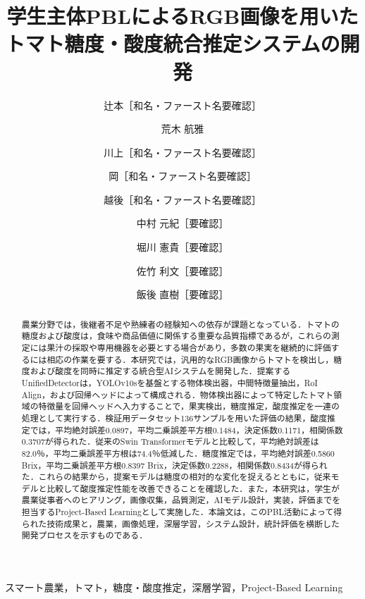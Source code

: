 \documentclass[authorproof,JRM,paper]{fujipressarticle}
\begin{document}
\pagestyle{fujipressstyle}

\title{学生主体PBLによるRGB画像を用いたトマト糖度・酸度統合推定システムの開発}
\author{辻本［和名・ファースト名要確認］ \and 荒木 航雅 \and 川上［和名・ファースト名要確認］ \and 岡［和名・ファースト名要確認］ \and 越後［和名・ファースト名要確認］ \and 中村 元紀［要確認］ \and 堀川 憲貴［要確認］ \and 佐竹 利文［要確認］ \and 飯後 直樹［要確認］}
\address{所属機関［要確認］\\
	住所［要確認］\\
	E-mail: メールアドレス［要確認］}
\maketitle

\begin{abstract}%
	\noindent 農業分野では，後継者不足や熟練者の経験知への依存が課題となっている．トマトの糖度および酸度は，食味や商品価値に関係する重要な品質指標であるが，これらの測定には果汁の採取や専用機器を必要とする場合があり，多数の果実を継続的に評価するには相応の作業を要する．本研究では，汎用的なRGB画像からトマトを検出し，糖度および酸度を同時に推定する統合型AIシステムを開発した．提案するUnifiedDetectorは，YOLOv10sを基盤とする物体検出器，中間特徴量抽出，RoI Align，および回帰ヘッドによって構成される．物体検出器によって特定したトマト領域の特徴量を回帰ヘッドへ入力することで，果実検出，糖度推定，酸度推定を一連の処理として実行する．検証用データセット136サンプルを用いた評価の結果，酸度推定では，平均絶対誤差0.0897，平均二乗誤差平方根0.1484，決定係数0.1171，相関係数0.3707が得られた．従来のSwin Transformerモデルと比較して，平均絶対誤差は82.0％，平均二乗誤差平方根は74.4％低減した．糖度推定では，平均絶対誤差0.5860 Brix，平均二乗誤差平方根0.8397 Brix，決定係数0.2288，相関係数0.8434が得られた．これらの結果から，提案モデルは糖度の相対的な変化を捉えるとともに，従来モデルと比較して酸度推定性能を改善できることを確認した．また，本研究は，学生が農業従事者へのヒアリング，画像収集，品質測定，AIモデル設計，実装，評価までを担当するProject-Based Learningとして実施した．本論文は，このPBL活動によって得られた技術成果と，農業，画像処理，深層学習，システム設計，統計評価を横断した開発プロセスを示すものである．
\end{abstract}

\begin{keywords}
	スマート農業，トマト，糖度・酸度推定，深層学習，Project-Based Learning
\end{keywords}
\end{document}
